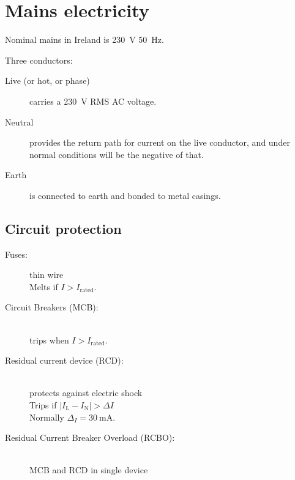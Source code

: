 \documentclass{pgslides}
\begin{document}


\section{Mains electricity}

\begin{frame}{\insertsectionhead}

Nominal mains in Ireland is \SI{230}{\volt} \SI{50}{\hertz}.

Three conductors: 
\begin{description}
\item[Live (or hot, or phase)] carries a \SI{230}{\volt} RMS AC voltage.
\item[Neutral] provides the return path for current on the live conductor, and under normal conditions will be the negative of that.
\item[Earth] is connected to earth and bonded to metal casings.
\end{description}

\end{frame}

\subsection{Circuit protection}

\begin{frame}{\insertsubsectionhead}
\begin{description}
\item[Fuses:] thin wire\\Melts if $I > I_{\mbox{rated}}$.
\item[Circuit Breakers (MCB):] ~\\trips when $I > I_{\mbox{rated}}$.
\item[Residual current device (RCD):] ~\\protects against electric shock\\
  Trips if $ \left \lvert I_{\mbox{L}} - I_{\mbox{N}} \right \rvert > \Delta I$\\ Normally $\Delta_I = \SI{30}{\milli\ampere}$.
\item[Residual Current Breaker Overload (RCBO):] ~ \\ MCB and RCD in single device
\end{description}
\end{frame}
\end{document}
